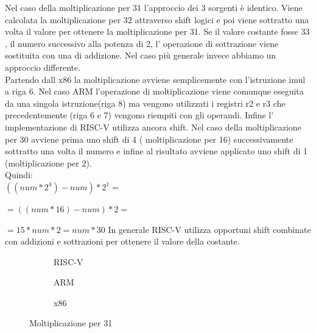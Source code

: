 \documentclass[12pt,a4paper]{report}
\begin{document}
\vspace{0.3 cm}

Nel caso della moltiplicazione per 31 l'approccio dei 3 sorgenti è identico. Viene calcolata la moltiplicazione per 32 attraverso shift logici e poi viene sottratto una volta il valore per ottenere la moltiplicazione per 31. Se il valore costante fosse 33 , il numero successivo alla potenza di 2, l' operazione di sottrazione viene sostituita con una di addizione. Nel caso più generale invece abbiamo un approccio differente.\\
Partendo dall x86 la moltiplicazione avviene semplicemente con l'istruzione imul a riga 6.  Nel caso ARM l'operazione di moltiplicazione viene comunque eseguita da una singola istruzione(riga 8) ma vengono utilizzati i registri r2 e r3 che precedentemente (riga 6 e 7) vengono riempiti con gli operandi. Infine l' implementazione di RISC-V utilizza ancora shift. Nel caso della moltiplicazione per 30 avviene prima uno shift di 4 ( moltiplicazione per 16) successivamente sottratto una volta il numero e infine al risultato avviene applicato uno shift di 1 (moltiplicazione per 2). \\ Quindi: \\ 
$((num * 2^4) - num ) * 2^1 = $ 

$ =((num * 16 ) - num ) * 2 =$ 

$ = 15 * num * 2 =  num *30 $ 
\vspace{0.2 cm}
In generale RISC-V utilizza opportuni shift combinate con addizioni e sottrazioni per ottenere il valore della costante.

\begin{figure}

     \begin{subfigure}[b]{0.3\textwidth}
  
        
        \label{Code:Mul31RISC}
	\caption{RISC-V}

     \end{subfigure}
     \hfill
     \begin{subfigure}[b]{0.3\textwidth}
         
          	
		\caption{ARM}
		 \label{Code:Mul31ARM}
     \end{subfigure}
     \hfill
     \begin{subfigure}[b]{0.3\textwidth}
         
          
	 \caption{x86}
	 \label{Code:Mul31X86}
     \end{subfigure}
     \caption{Moltiplicazione per 31}
     \end{figure}
\end{document}
